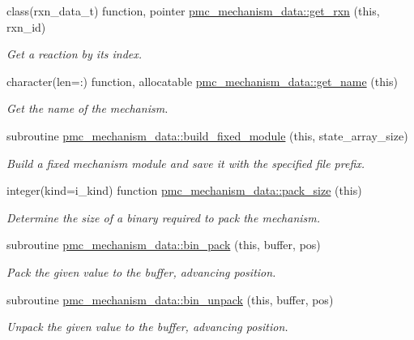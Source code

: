 \begin{DoxyCompactItemize}
class(rxn\+\_\+data\+\_\+t) function, pointer \mbox{\hyperlink{namespacepmc__mechanism__data_af57977440b3989fba90251b16afbb65a}{pmc\+\_\+mechanism\+\_\+data\+::get\+\_\+rxn}} (this, rxn\+\_\+id)
\begin{DoxyCompactList}\small\item\em Get a reaction by its index. \end{DoxyCompactList}\item 
character(len=\+:) function, allocatable \mbox{\hyperlink{namespacepmc__mechanism__data_a181513498181e44bd8e3d9cc4aa648e7}{pmc\+\_\+mechanism\+\_\+data\+::get\+\_\+name}} (this)
\begin{DoxyCompactList}\small\item\em Get the name of the mechanism. \end{DoxyCompactList}\item 
subroutine \mbox{\hyperlink{namespacepmc__mechanism__data_af51515f018cda6a9b93b9f0b23362574}{pmc\+\_\+mechanism\+\_\+data\+::build\+\_\+fixed\+\_\+module}} (this, state\+\_\+array\+\_\+size)
\begin{DoxyCompactList}\small\item\em Build a fixed mechanism module and save it with the specified file prefix. \end{DoxyCompactList}\item 
integer(kind=i\+\_\+kind) function \mbox{\hyperlink{namespacepmc__mechanism__data_a3b72bf41eb5c1c7f0e9d93f00dc837ae}{pmc\+\_\+mechanism\+\_\+data\+::pack\+\_\+size}} (this)
\begin{DoxyCompactList}\small\item\em Determine the size of a binary required to pack the mechanism. \end{DoxyCompactList}\item 
subroutine \mbox{\hyperlink{namespacepmc__mechanism__data_a3cecaca4b8f5a851fadd25ad82468c82}{pmc\+\_\+mechanism\+\_\+data\+::bin\+\_\+pack}} (this, buffer, pos)
\begin{DoxyCompactList}\small\item\em Pack the given value to the buffer, advancing position. \end{DoxyCompactList}\item 
subroutine \mbox{\hyperlink{namespacepmc__mechanism__data_a24709e6abb0a63249db0eec686f64387}{pmc\+\_\+mechanism\+\_\+data\+::bin\+\_\+unpack}} (this, buffer, pos)
\begin{DoxyCompactList}\small\item\em Unpack the given value to the buffer, advancing position. \end{DoxyCompactList}\item 

\end{DoxyCompactItemize}
